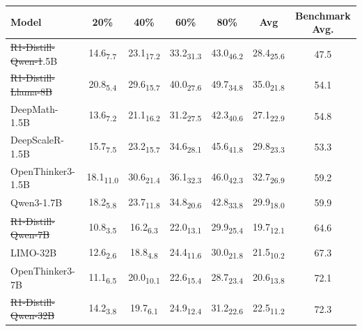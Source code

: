 \documentclass{article} %
\providecommand{\DIFaddtex}[1]{{\protect\color{blue}\uwave{#1}}} %
\providecommand{\DIFdeltex}[1]{{\protect\color{red}\sout{#1}}}                      %
\providecommand{\DIFaddFL}[1]{\DIFadd{#1}} %
\providecommand{\DIFdelFL}[1]{\DIFdel{#1}} %
\providecommand{\DIFaddbeginFL}{} %
\providecommand{\DIFaddendFL}{} %
\providecommand{\DIFdelbeginFL}{} %
\providecommand{\DIFdelendFL}{} %
\providecommand{\DIFadd}[1]{\texorpdfstring{\DIFaddtex{#1}}{#1}} %
\providecommand{\DIFdel}[1]{\texorpdfstring{\DIFdeltex{#1}}{}} %
\newcommand{\DIFscaledelfig}{0.5}
\newlength{\DIFdelgraphicswidth} %
\newlength{\DIFdelgraphicsheight} %
\newcommand{\DIFaddincludegraphics}[2][]{{\color{blue}\fbox{\DIFOincludegraphics[#1]{#2}}}} %
\newcommand{\DIFdelincludegraphics}[2][]{%
\sbox{\DIFdelgraphicsbox}{\DIFOincludegraphics[#1]{#2}}%
\settoboxwidth{\DIFdelgraphicswidth}{\DIFdelgraphicsbox} %
\settoboxtotalheight{\DIFdelgraphicsheight}{\DIFdelgraphicsbox} %
\scalebox{\DIFscaledelfig}{%
\parbox[b]{\DIFdelgraphicswidth}{\usebox{\DIFdelgraphicsbox}\\[-\baselineskip] \rule{\DIFdelgraphicswidth}{0em}}\llap{\resizebox{\DIFdelgraphicswidth}{\DIFdelgraphicsheight}{%
\setlength{\unitlength}{\DIFdelgraphicswidth}%
\begin{picture}(1,1)%
\thicklines\linethickness{2pt} %
{\color[rgb]{1,0,0}\put(0,0){\framebox(1,1){}}}%
{\color[rgb]{1,0,0}\put(0,0){\line( 1,1){1}}}%
{\color[rgb]{1,0,0}\put(0,1){\line(1,-1){1}}}%
\end{picture}%
}\hspace*{3pt}}} %
} %
\DeclareRobustCommand{\DIFaddbeginFL}{\DIFOaddbeginFL \let\includegraphics\DIFaddincludegraphics} %
\DeclareRobustCommand{\DIFaddendFL}{\DIFOaddendFL \let\includegraphics\DIFOincludegraphics} %
\DeclareRobustCommand{\DIFdelbeginFL}{\DIFOdelbeginFL \let\includegraphics\DIFdelincludegraphics} %
\DeclareRobustCommand{\DIFdelendFL}{\DIFOaddendFL \let\includegraphics\DIFOincludegraphics} %
\begin{document}
\begin{table}[ht!]
  \centering
  \begin{tabular}{lccccc|c}
    \toprule
    \textbf{Model} & \textbf{20\%} & \textbf{40\%} & \textbf{60\%} & \textbf{80\%} & \textbf{Avg} & \textbf{Benchmark Avg.} \\
    \midrule
    \DIFdelbeginFL \DIFdelFL{R1-Distill-Qwen-1}\DIFdelendFL \DIFaddbeginFL \DIFaddFL{R1-Qwen-1}\DIFaddendFL .5B    & 14.6\textsubscript{7.7} & 23.1\textsubscript{17.2} & 33.2\textsubscript{31.3} & 43.0\textsubscript{46.2} & 28.4\textsubscript{25.6} & 47.5 \\
    \DIFdelbeginFL \DIFdelFL{R1-Distill-Llama-8B     }\DIFdelendFL \DIFaddbeginFL \DIFaddFL{R1-Llama-8B     }\DIFaddendFL & 20.8\textsubscript{5.4} & 29.6\textsubscript{15.7} & 40.0\textsubscript{27.6} & 49.7\textsubscript{34.8} & 35.0\textsubscript{21.8} & 54.1 \\
    DeepMath-1.5B           & 13.6\textsubscript{7.2} & 21.1\textsubscript{16.2} & 31.2\textsubscript{27.5} & 42.3\textsubscript{40.6} & 27.1\textsubscript{22.9} & 54.8 \\
    DeepScaleR-1.5B         & 15.7\textsubscript{7.5} & 23.2\textsubscript{15.7} & 34.6\textsubscript{28.1} & 45.6\textsubscript{41.8} & 29.8\textsubscript{23.3} & 53.3 \\
    OpenThinker3-1.5B       & 18.1\textsubscript{11.0} & 30.6\textsubscript{21.4} & 36.1\textsubscript{32.3} & 46.0\textsubscript{42.3} & 32.7\textsubscript{26.9} & 59.2 \\
    Qwen3-1.7B              & 18.2\textsubscript{5.8} & 23.7\textsubscript{11.8} & 34.8\textsubscript{20.6} & 42.8\textsubscript{33.8} & 29.9\textsubscript{18.0} & 59.9 \\
    \midrule
    \DIFdelbeginFL \DIFdelFL{R1-Distill-Qwen-7B      }\DIFdelendFL \DIFaddbeginFL \DIFaddFL{R1-Qwen-7B      }\DIFaddendFL & 10.8\textsubscript{3.5} & 16.2\textsubscript{6.3} & 22.0\textsubscript{13.1} & 29.9\textsubscript{25.4} & 19.7\textsubscript{12.1} & 64.6 \\
    LIMO-32B                & 12.6\textsubscript{2.6} & 18.8\textsubscript{4.8} & 24.4\textsubscript{11.6} & 30.0\textsubscript{21.8} & 21.5\textsubscript{10.2} & 67.3 \\
    OpenThinker3-7B         & 11.1\textsubscript{6.5} & 20.0\textsubscript{10.1} & 22.6\textsubscript{15.4} & 28.7\textsubscript{23.4} & 20.6\textsubscript{13.8} & 72.1 \\
    \DIFdelbeginFL \DIFdelFL{R1-Distill-Qwen-32B     }\DIFdelendFL \DIFaddbeginFL \DIFaddFL{R1-Qwen-32B     }\DIFaddendFL & 14.2\textsubscript{3.8} & 19.7\textsubscript{6.1} & 24.9\textsubscript{12.4} & 31.2\textsubscript{22.6} & 22.5\textsubscript{11.2} & 72.3 \\

\end{tabular}
\end{table}
\end{document}
